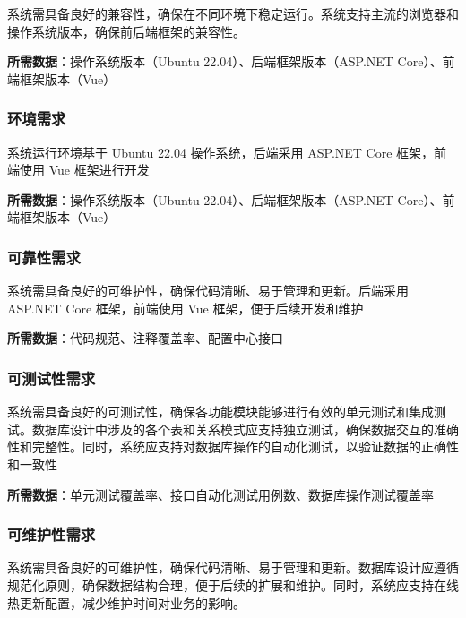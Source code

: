 \documentclass[]{article}
\begin{document}
系统需具备良好的兼容性，确保在不同环境下稳定运行。系统支持主流的浏览器和操作系统版本，确保前后端框架的兼容性。

\textbf{所需数据}：操作系统版本（Ubuntu 22.04）、后端框架版本（ASP.NET
Core）、前端框架版本（Vue）

\hypertarget{ux73afux5883ux9700ux6c42}{%
  \subsubsection{环境需求}\label{ux73afux5883ux9700ux6c42}}

系统运行环境基于 Ubuntu 22.04 操作系统，后端采用 ASP.NET Core
框架，前端使用 Vue 框架进行开发

\textbf{所需数据}：操作系统版本（Ubuntu 22.04）、后端框架版本（ASP.NET
Core）、前端框架版本（Vue）

\hypertarget{ux53efux9760ux6027ux9700ux6c42-1}{%
  \subsubsection{可靠性需求}\label{ux53efux9760ux6027ux9700ux6c42-1}}

系统需具备良好的可维护性，确保代码清晰、易于管理和更新。后端采用 ASP.NET
Core 框架，前端使用 Vue 框架，便于后续开发和维护

\textbf{所需数据}：代码规范、注释覆盖率、配置中心接口

\hypertarget{ux53efux6d4bux8bd5ux6027ux9700ux6c42}{%
  \subsubsection{可测试性需求}\label{ux53efux6d4bux8bd5ux6027ux9700ux6c42}}

系统需具备良好的可测试性，确保各功能模块能够进行有效的单元测试和集成测试。数据库设计中涉及的各个表和关系模式应支持独立测试，确保数据交互的准确性和完整性。同时，系统应支持对数据库操作的自动化测试，以验证数据的正确性和一致性

\textbf{所需数据}：单元测试覆盖率、接口自动化测试用例数、数据库操作测试覆盖率

\hypertarget{ux53efux7ef4ux62a4ux6027ux9700ux6c42}{%
  \subsubsection{可维护性需求}\label{ux53efux7ef4ux62a4ux6027ux9700ux6c42}}

系统需具备良好的可维护性，确保代码清晰、易于管理和更新。数据库设计应遵循规范化原则，确保数据结构合理，便于后续的扩展和维护。同时，系统应支持在线热更新配置，减少维护时间对业务的影响。
\end{document}
